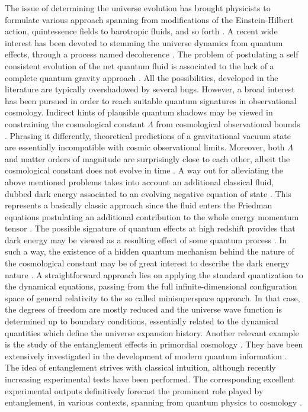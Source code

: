 \documentclass[nofootinbib,prd,superscriptaddress,showpacs,showkeys,]{revtex4}
\begin{document}
The issue of determining the universe evolution has brought physicists to formulate various approach spanning from modifications of the Einstein-Hilbert action, quintessence fields to barotropic fluids, and so forth \cite{rev1,rev1bis,rev2,rev2bis}. A recent wide interest has been devoted to stemming the universe dynamics from quantum effects, through a process named decoherence \cite{deco}. The problem of postulating a self consistent evolution of the net quantum fluid is associated to the lack of a complete quantum gravity approach \cite{a,patrizia}. All the possibilities, developed in the literature are typically overshadowed by several bugs. However, a broad interest has been pursued in order to reach suitable quantum signatures in observational cosmology. Indirect hints of plausible quantum shadows may be viewed in constraining the cosmological constant $\Lambda$ from cosmological observational bounds \cite{lambda}. Phrasing it differently, theoretical predictions of a gravitational vacuum state are essentially incompatible with cosmic observational limits. Moreover, both $\Lambda$ and matter orders of magnitude are surprisingly close to each other, albeit the cosmological constant does not evolve in time \cite{lambda2}. A way out for alleviating the above mentioned problems takes into account an additional classical fluid, dubbed dark energy associated to an evolving negative equation of state \cite{darkenergy}. This represents a basically classic approach since the fluid enters the Friedman equations postulating an additional contribution to the whole energy momentum tensor \cite{darkenergy2}. The possible signature of quantum effects at high redshift provides that dark energy may be viewed as a resulting effect of some quantum process \cite{ioesalv}. In such a way, the existence of a hidden quantum mechanism behind the nature of the cosmological constant may be of great interest to describe the dark energy nature \cite{quantumlambda}. A straightforward approach lies on applying the standard quantization to the dynamical equations, passing from the full infinite-dimensional configuration space of general relativity to the so called minisuperspace approach. In that case, the degrees of freedom are mostly reduced and the universe wave function 	 is determined up to boundary conditions, essentially related to the dynamical quantities which define the universe expansion history. Another relevant example is the study of the entanglement effects in primordial cosmology \cite{jae1,jae2}. They have been extensively investigated in the development of modern quantum information \cite{entareview}. The idea of entanglement strives with classical intuition, although recently increasing experimental tests have been performed. The corresponding excellent experimental outputs definitively forecast the prominent role played by entanglement, in various contexts, spanning from quantum physics to cosmology \cite{entareview2}.
\end{document}
